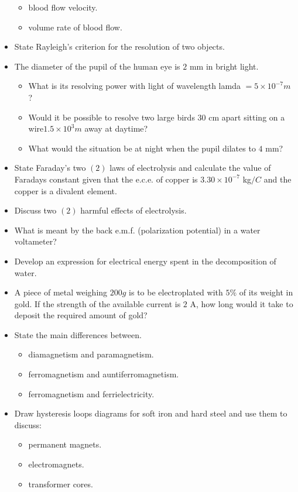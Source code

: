 \documentclass{article}
\begin{document}
\begin{itemize}
\begin{itemize}
\item blood flow velocity. 
\item volume rate of blood flow. 
\end{itemize}
\item State Rayleigh’s criterion for the resolution of two objects. 
\item The diameter of the pupil of the human eye is $ 2$ mm in bright light.
 \begin{itemize}
\item What is its resolving power with light of wavelength lamda $ =5 \times 10^{-7}m$ ? 
\item Would it be possible to resolve two large birds $ 30$ cm apart sitting on a wire$ 1.5 \times 10^{3}m$ away at daytime? 
\item What would the situation be at night when the pupil dilates to $ 4$ mm? 
\end{itemize}
\item State Faraday’s two $ (2)$ laws of electrolysis and calculate the value of Faradays constant given that the e.c.e. of copper is $ 3.30 \times 10^{-7}$ kg$/C$ and the copper is a divalent element. 
\item Discuss two $ (2)$ harmful effects of electrolysis. 
\item What is meant by the back e.m.f. (polarization potential) in a water voltameter? 
\item Develop an expression for electrical energy spent in the decomposition of water. 
\item A piece of metal weighing $ 200g$ is to be electroplated with $ 5\%$ of its weight in gold. If the strength of the available current is $ 2$ A, how long would it take to deposit the required amount of gold?
\item State the main differences between.
 \begin{itemize}
\item diamagnetism and paramagnetism. 
\item ferromagnetism and auntiferromagnetism. 
\item ferromagnetism and ferrielectricity. 
\end{itemize}
\item Draw hysteresis loops diagrams for soft iron and hard steel and use them to discuss:
 \begin{itemize}
\item permanent magnets.
\item electromagnets.
\item transformer cores. 

\end{itemize}
\end{itemize}
\end{document}

